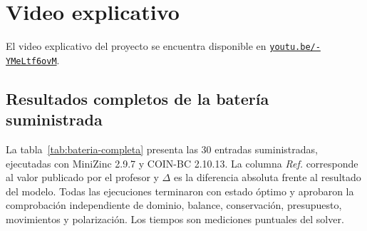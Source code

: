 \documentclass[11pt,letterpaper]{article}
\begin{document}
\section{Video explicativo}

El video explicativo del proyecto se encuentra disponible en
\href{https://youtu.be/-YMeLtf6ovM}
{\texttt{youtu.be/-YMeLtf6ovM}}.

\clearpage
\appendix
\begin{landscape}
\section{Resultados completos de la batería suministrada}

La tabla~\ref{tab:bateria-completa} presenta las 30 entradas suministradas,
ejecutadas con MiniZinc 2.9.7 y COIN-BC 2.10.13. La columna \emph{Ref.}
corresponde al valor publicado por el profesor y \(\Delta\) es la diferencia
absoluta frente al resultado del modelo. Todas las ejecuciones terminaron con
estado óptimo y aprobaron la comprobación independiente de dominio, balance,
conservación, presupuesto, movimientos y polarización. Los tiempos son
mediciones puntuales del solver.


\end{landscape}
\end{document}
